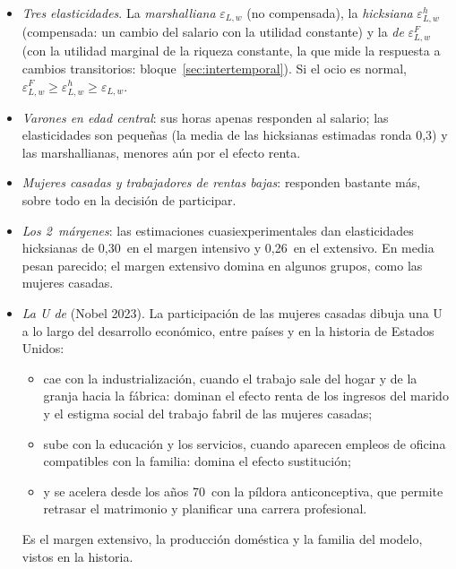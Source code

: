 \documentclass[11pt]{article}
\begin{document}
\begin{itemize}
\item \emph{Tres elasticidades}. La \emph{marshalliana} $\varepsilon_{L,w}$ (no compensada), la \emph{hicksiana} $\varepsilon^h_{L,w}$ (compensada: un cambio del salario con la utilidad constante) y la \emph{de } $\varepsilon^F_{L,w}$ (con la utilidad marginal de la riqueza constante, la que mide la respuesta a cambios transitorios: bloque~\ref{sec:intertemporal}). Si el ocio es normal, $\varepsilon^F_{L,w}\geq\varepsilon^h_{L,w}\geq\varepsilon_{L,w}$\nocite{Keane2011Labor}.
\item \emph{Varones en edad central}: sus horas apenas responden al salario; las elasticidades son pequeñas (la media de las hicksianas estimadas ronda 0{,}3) y las marshallianas, menores aún por el efecto renta\nocite{BlundellMaCurdy1999Labor,Keane2011Labor}.
\item \emph{Mujeres casadas y trabajadores de rentas bajas}: responden bastante más, sobre todo en la decisión de participar\nocite{Keane2011Labor}.
\item \emph{Los 2~márgenes}: las estimaciones cuasiexperimentales dan elasticidades hicksianas de 0{,}30~en el margen intensivo y 0{,}26~en el extensivo\nocite{Chetty2011Micro}. En media pesan parecido; el margen extensivo domina en algunos grupos, como las mujeres casadas.
\item \emph{La U de } (Nobel 2023). La participación de las mujeres casadas dibuja una U a lo largo del desarrollo económico, entre países y en la historia de Estados Unidos\nocite{Goldin1995UShaped}:
  \begin{itemize}
  \item cae con la industrialización, cuando el trabajo sale del hogar y de la granja hacia la fábrica: dominan el efecto renta de los ingresos del marido y el estigma social del trabajo fabril de las mujeres casadas;
  \item sube con la educación y los servicios, cuando aparecen empleos de oficina compatibles con la familia: domina el efecto sustitución;
  \item y se acelera desde los años 70~con la píldora anticonceptiva, que permite retrasar el matrimonio y planificar una carrera profesional\nocite{GoldinKatz2002Power}.
  \end{itemize}
  Es el margen extensivo, la producción doméstica y la familia del modelo, vistos en la historia.
\end{itemize}
\end{document}
